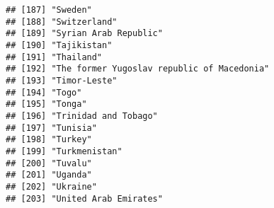 \documentclass[
]{article}
\begin{document}
\begin{verbatim}
## [187] "Sweden"                                                                                                                                               
## [188] "Switzerland"                                                                                                                                          
## [189] "Syrian Arab Republic"                                                                                                                                 
## [190] "Tajikistan"                                                                                                                                           
## [191] "Thailand"                                                                                                                                             
## [192] "The former Yugoslav republic of Macedonia"                                                                                                            
## [193] "Timor-Leste"                                                                                                                                          
## [194] "Togo"                                                                                                                                                 
## [195] "Tonga"                                                                                                                                                
## [196] "Trinidad and Tobago"                                                                                                                                  
## [197] "Tunisia"                                                                                                                                              
## [198] "Turkey"                                                                                                                                               
## [199] "Turkmenistan"                                                                                                                                         
## [200] "Tuvalu"                                                                                                                                               
## [201] "Uganda"                                                                                                                                               
## [202] "Ukraine"                                                                                                                                              
## [203] "United Arab Emirates"                                                                                                                                 

\end{verbatim}
\end{document}
